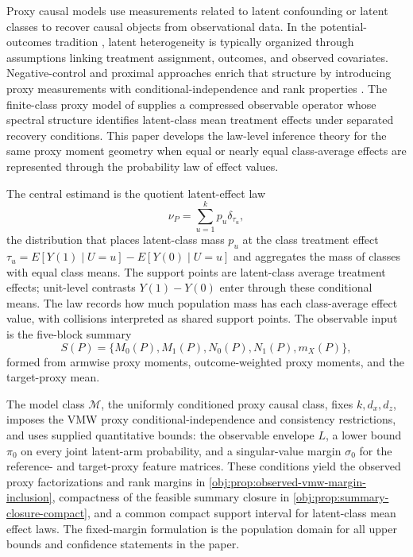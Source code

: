 \documentclass[11pt]{article}
\begin{document}
Proxy causal models use measurements related to latent confounding or latent classes to recover causal objects from observational data.  In the potential-outcomes tradition \citep{Neyman1990,Rubin1974,Holland1986,ImbensRubin2015}, latent heterogeneity is typically organized through assumptions linking treatment assignment, outcomes, and observed covariates.  Negative-control and proximal approaches enrich that structure by introducing proxy measurements with conditional-independence and rank properties \citep{MiaoGengTchetgen2018,ShiMiaoNelsonTchetgen2020,TchetgenTchetgen2024,CuiPuShiMiaoTchetgen2024,MiaoHuOgburnZhou2023,QiMiaoZhang2024,LiuParkLiTchetgen2024,LiLindermanShiTchetgen2024,AiShan2025,SahaBatesShah2026}.  The finite-class proxy model of \citet{VirkMazaheriWu2026} supplies a compressed observable operator whose spectral structure identifies latent-class mean treatment effects under separated recovery conditions.  This paper develops the law-level inference theory for the same proxy moment geometry when equal or nearly equal class-average effects are represented through the probability law of effect values.

The central estimand is the quotient latent-effect law
\[
\nu_P=\sum_{u=1}^k p_u\delta_{\tau_u},
\]
the distribution that places latent-class mass \(p_u\) at the class treatment effect \(\tau_u=E[Y(1)\mid U=u]-E[Y(0)\mid U=u]\) and aggregates the mass of classes with equal class means.  The support points are latent-class average treatment effects; unit-level contrasts \(Y(1)-Y(0)\) enter through these conditional means.  The law records how much population mass has each class-average effect value, with collisions interpreted as shared support points.  The observable input is the five-block summary
\[
S(P)=\{M_0(P),M_1(P),N_0(P),N_1(P),m_X(P)\},
\]
formed from armwise proxy moments, outcome-weighted proxy moments, and the target-proxy mean.

The model class \(\mathcal M\), the uniformly conditioned proxy causal class, fixes \(k,d_x,d_z\), imposes the VMW proxy conditional-independence and consistency restrictions, and uses supplied quantitative bounds: the observable envelope \(L\), a lower bound \(\pi_0\) on every joint latent-arm probability, and a singular-value margin \(\sigma_0\) for the reference- and target-proxy feature matrices.  These conditions yield the observed proxy factorizations and rank margins in \cref{obj:prop:observed-vmw-margin-inclusion}, compactness of the feasible summary closure in \cref{obj:prop:summary-closure-compact}, and a common compact support interval for latent-class mean effect laws.  The fixed-margin formulation is the population domain for all upper bounds and confidence statements in the paper.
\end{document}
